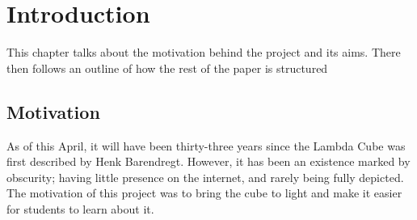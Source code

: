 \documentclass{l4proj}
\begin{document}
%
%
%
%
%
%
%
%
\chapter{Introduction}


This chapter talks about the motivation behind the project and its aims.  There then follows an outline of how the rest of the paper is structured

\section{Motivation}

As of this April, it will have been thirty-three years since the Lambda Cube was first described by Henk Barendregt.  However, it has been an existence marked by obscurity; having little presence on the internet, and rarely being fully depicted.  The motivation of this project was to bring the cube to light and make it easier for students to learn about it.
\end{document}

